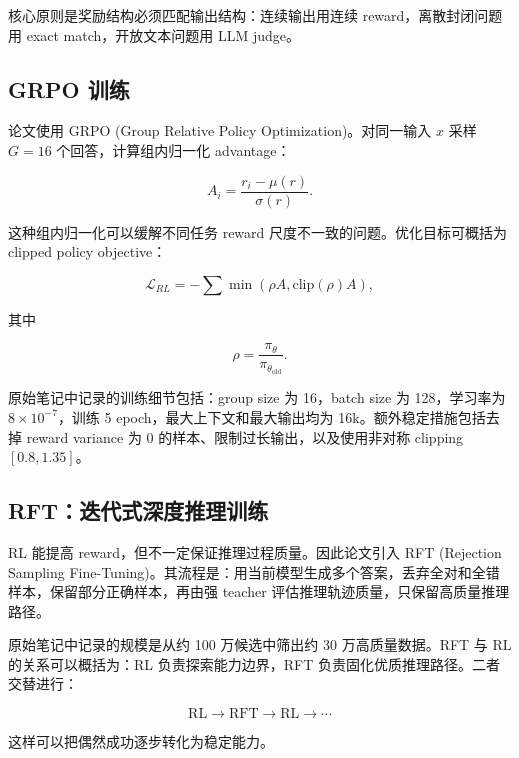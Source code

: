 核心原则是奖励结构必须匹配输出结构：连续输出用连续 reward，离散封闭问题用 exact match，开放文本问题用 LLM judge。

\subsection{GRPO 训练}

论文使用 GRPO (Group Relative Policy Optimization)。对同一输入 $x$ 采样 $G=16$ 个回答，计算组内归一化 advantage：

\begin{equation}
    A_i = \frac{r_i-\mu(r)}{\sigma(r)}.
\end{equation}

这种组内归一化可以缓解不同任务 reward 尺度不一致的问题。优化目标可概括为 clipped policy objective：

\begin{equation}
    \mathcal{L}_{RL}
    = -\sum \min(\rho A, \mathrm{clip}(\rho)A),
\end{equation}

其中

\begin{equation}
    \rho = \frac{\pi_\theta}{\pi_{\theta_{\mathrm{old}}}}.
\end{equation}

原始笔记中记录的训练细节包括：group size 为 16，batch size 为 128，学习率为 $8\times10^{-7}$，训练 5 epoch，最大上下文和最大输出均为 16k。额外稳定措施包括去掉 reward variance 为 0 的样本、限制过长输出，以及使用非对称 clipping $[0.8,1.35]$。

\subsection{RFT：迭代式深度推理训练}

RL 能提高 reward，但不一定保证推理过程质量。因此论文引入 RFT (Rejection Sampling Fine-Tuning)。其流程是：用当前模型生成多个答案，丢弃全对和全错样本，保留部分正确样本，再由强 teacher 评估推理轨迹质量，只保留高质量推理路径。

原始笔记中记录的规模是从约 100 万候选中筛出约 30 万高质量数据。RFT 与 RL 的关系可以概括为：RL 负责探索能力边界，RFT 负责固化优质推理路径。二者交替进行：

\begin{equation}
    \mathrm{RL} \rightarrow \mathrm{RFT} \rightarrow \mathrm{RL} \rightarrow \cdots
\end{equation}

这样可以把偶然成功逐步转化为稳定能力。

